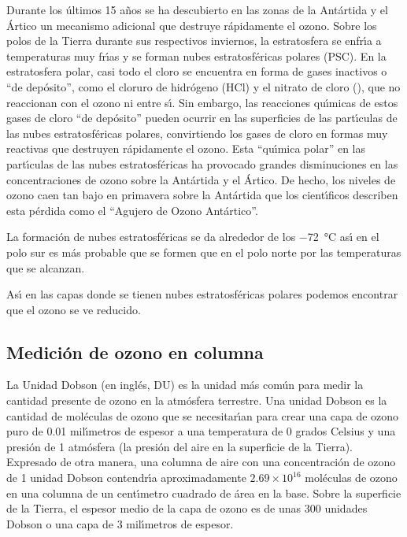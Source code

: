 Durante los \'ultimos 15 a\~nos se ha descubierto en las zonas de la Ant\'artida y el \'Artico un mecanismo adicional que destruye r\'apidamente el ozono. Sobre los polos de la Tierra durante sus respectivos inviernos, la estratosfera se enfr\'{\i}a a temperaturas muy fr\'{\i}as y se forman nubes estratosf\'ericas polares (PSC). En la estratosfera polar, casi todo el cloro se encuentra en forma de gases inactivos o ``de dep\'osito'', como el cloruro de hidr\'ogeno (HCl) y el nitrato de cloro (), que no reaccionan con el ozono ni entre s\'{\i}. Sin embargo, las reacciones qu\'{\i}micas de estos gases de cloro ``de dep\'osito''  pueden ocurrir en las superficies de las part\'{\i}culas de las nubes estratosf\'ericas polares, convirtiendo los gases de cloro en formas muy reactivas que destruyen r\'apidamente el ozono. Esta ``qu\'{\i}mica polar'' en las part\'{\i}culas de las nubes estratosf\'ericas ha provocado grandes disminuciones en las concentraciones de ozono sobre la Ant\'artida y el \'Artico. De hecho, los niveles de ozono caen tan bajo en primavera sobre la Ant\'artida que los cient\'{\i}ficos describen esta p\'erdida como el ``Agujero de Ozono Ant\'artico''.

La formaci\'on de nubes estratosf\'ericas se da alrededor de los \SI{-72}{\celsius}  as\'{\i} en el polo sur es m\'as probable que se formen que en el polo norte por las temperaturas que se alcanzan.

As\'{\i} en las capas donde se tienen nubes estratosf\'ericas polares podemos encontrar que el ozono se ve reducido.

\subsection{Medici\'on de ozono en columna}
La Unidad Dobson (en ingl\'es, DU) es la unidad m\'as com\'un para medir la cantidad presente de ozono en la atm\'osfera terrestre. Una unidad Dobson es la cantidad de mol\'eculas de ozono que se necesitar\'{\i}an para crear una capa de ozono puro de 0.01 mil\'{\i}metros de espesor a una temperatura de 0 grados Celsius y una presi\'on de 1 atm\'osfera (la presi\'on del aire en la superficie de la Tierra). Expresado de otra manera, una columna de aire con una concentraci\'on de ozono de 1 unidad Dobson contendr\'{\i}a aproximadamente $2.69\times10^{16}$ mol\'eculas de ozono en una columna de un cent\'{\i}metro cuadrado de \'area en la base. Sobre la superficie de la Tierra, el espesor medio de la capa de ozono es de unas 300 unidades Dobson o una capa de 3 mil\'{\i}metros de espesor.


